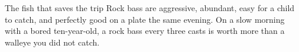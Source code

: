 \begin{telospanel}{The fish that saves the trip}
Rock bass are aggressive, abundant, easy for a child to catch, and perfectly good on a plate the same evening. On a slow morning with a bored ten-year-old, a rock bass every three casts is worth more than a walleye you did not catch. 
\end{telospanel}



\advisorypanfish


